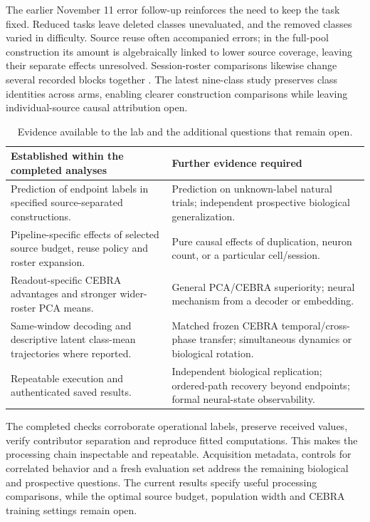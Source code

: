 \documentclass[10pt,a4paper]{article}
\begin{document}
The earlier November 11 error follow-up reinforces the need to keep the task fixed. Reduced tasks leave deleted classes unevaluated, and the removed classes varied in difficulty. Source reuse often accompanied errors; in the full-pool construction its amount is algebraically linked to lower source coverage, leaving their separate effects unresolved. Session-roster comparisons likewise change several recorded blocks together \cite{errors}. The latest nine-class study preserves class identities across arms, enabling clearer construction comparisons while leaving individual-source causal attribution open.

\begin{table}[h!]
\caption{Evidence available to the lab and the additional questions that remain open.}
\label{tab:claims}\small
\begin{tabularx}{\linewidth}{Y Y}
\toprule
Established within the completed analyses & Further evidence required \\
\midrule
Prediction of endpoint labels in specified source-separated constructions. & Prediction on unknown-label natural trials; independent prospective biological generalization. \\
Pipeline-specific effects of selected source budget, reuse policy and roster expansion. & Pure causal effects of duplication, neuron count, or a particular cell/session. \\
Readout-specific CEBRA advantages and stronger wider-roster PCA means. & General PCA/CEBRA superiority; neural mechanism from a decoder or embedding. \\
Same-window decoding and descriptive latent class-mean trajectories where reported. & Matched frozen CEBRA temporal/cross-phase transfer; simultaneous dynamics or biological rotation. \\
Repeatable execution and authenticated saved results. & Independent biological replication; ordered-path recovery beyond endpoints; formal neural-state observability. \\
\bottomrule
\end{tabularx}
\end{table}

The completed checks corroborate operational labels, preserve received values, verify contributor separation and reproduce fitted computations. This makes the processing chain inspectable and repeatable. Acquisition metadata, controls for correlated behavior and a fresh evaluation set address the remaining biological and prospective questions. The current results specify useful processing comparisons, while the optimal source budget, population width and CEBRA training settings remain open.
\end{document}

